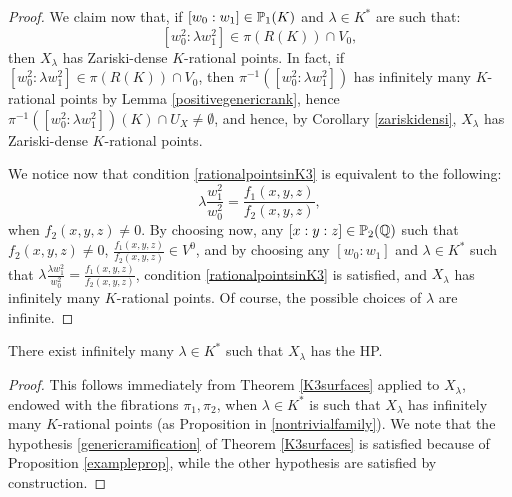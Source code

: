 \documentclass[a4paper,12pt]{article}
\begin{document}
\begin{proof}
	We claim now that, if $[w_0:w_1]\in \P_1(K)$ and $\lambda \in K^*$ are such that:
	 \begin{equation}\label{rationalpointsinK3}
	 	[w_0^2:\lambda w_1^2]\in \pi(R(K))\cap V_0,
	 \end{equation}	 
	then $X_{\lambda}$ has Zariski-dense $K$-rational points. In fact, if $ [w_0^2:\lambda w_1^2]\in \pi(R(K))\cap V_0$, then $\pi^{-1}([w_0^2:\lambda w_1^2])$ has infinitely many $K$-rational points by Lemma \ref{positivegenericrank}, hence $\pi^{-1}([w_0^2:\lambda w_1^2])(K)\cap U_X\neq \emptyset$, and hence, by Corollary \ref{zariskidensi}, $X_{\lambda}$ has Zariski-dense $K$-rational points.
	
	We notice now that condition \ref{rationalpointsinK3} is equivalent to the following:
	\[
	\lambda \frac{w_1^2}{w_0^2}=\frac{f_1(x,y,z)}{f_2(x,y,z)},
	\]
	when $f_2(x,y,z) \neq 0$.
	By choosing now, any $[x:y:z]\in \P_2(\Q)$ such that $f_2(x,y,z) \neq 0$, $\frac{f_1(x,y,z)}{f_2(x,y,z)}\in V^0$, and by choosing any $[w_0:w_1]$ and $\lambda \in K^*$ such that $\lambda \frac{\lambda w_1^2}{w_0^2}=\frac{f_1(x,y,z)}{f_2(x,y,z)}$, condition \ref{rationalpointsinK3} is satisfied, and $X_{\lambda}$ has infinitely many $K$-rational points. Of course, the possible choices of $\lambda$ are infinite.
\end{proof}

\begin{corollary}\label{finalcountdown}
	There exist infinitely many $\lambda \in K^*$ such that $X_{\lambda}$ has the HP.
\end{corollary}
\begin{proof}
	This follows immediately from Theorem \ref{K3surfaces} applied to $X_{\lambda}$, endowed with the fibrations $\pi_1, \pi_2$, when $\lambda \in K^*$ is such that $X_{\lambda}$ has infinitely many $K$-rational points (as Proposition in \ref{nontrivialfamily}). We note that the hypothesis \ref{genericramification} of Theorem \ref{K3surfaces} is satisfied because of Proposition \ref{exampleprop}, while the other hypothesis are satisfied by construction.
\end{proof}
\end{document}
